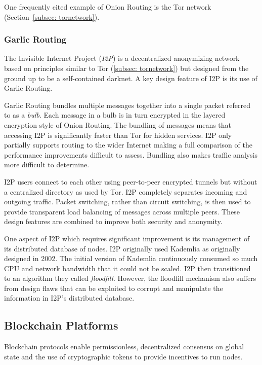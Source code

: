 One frequently cited example of Onion Routing is the Tor network (Section~\ref{subsec: tornetwork}).

\subsubsection{Garlic Routing}
\label{subsec-garlicrouting}
The Invisible Internet Project (\textit{I2P}) is a decentralized anonymizing network based on principles similar to Tor (\ref{subsec: tornetwork}) but designed from the ground up to be a self-contained darknet. A key design feature of I2P is its use of Garlic Routing\cite{26}.


Garlic Routing bundles multiple messages together into a single packet referred to as a \textit{bulb}. Each message in a bulb is in turn encrypted in the layered encryption style of Onion Routing. The bundling of messages means that accessing I2P is significantly faster than Tor for hidden services. I2P only partially supports routing to the wider Internet making a full comparison of the performance improvements difficult to assess. Bundling also makes traffic analysis more difficult to determine.

I2P users connect to each other using peer-to-peer encrypted tunnels but without a centralized directory as used by Tor. I2P completely separates incoming and outgoing traffic. Packet switching, rather than circuit switching, is then used to provide transparent load balancing of messages across multiple peers. These design features are combined to improve both security and anonymity.

One aspect of I2P which requires significant improvement is its management of its distributed database of nodes. I2P originally used Kademlia as originally designed in 2002\cite{27}. The initial version of Kademlia continuously consumed so much CPU and network bandwidth that it could not be scaled. I2P then transitioned to an algorithm they called \textit{floodfill}. However, the floodfill mechanism also suffers from design flaws that can be exploited to corrupt and manipulate the information in I2P's distributed database\cite{28}.


\subsection{Blockchain Platforms}
Blockchain protocols enable permissionless, decentralized consensus on global state and the use of cryptographic tokens to provide incentives to run nodes.


